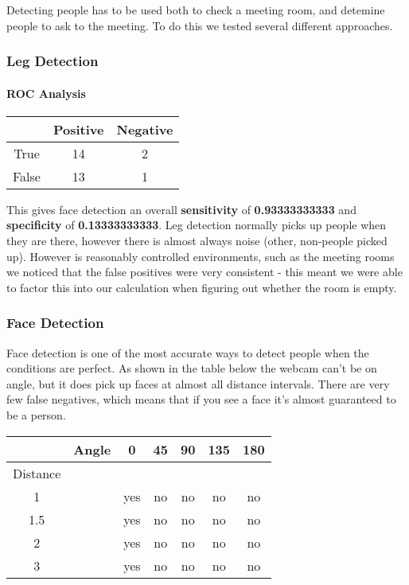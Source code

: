 \documentclass[12pt]{article}
\begin{document}
Detecting people has to be used both to check a meeting room, and detemine people to ask to the meeting. To do this we tested several different approaches.

\subsubsection{Leg Detection}

\paragraph{ROC Analysis}

\begin{center}
\begin{tabular}{|c|c|c|}
\hline
& Positive & Negative\\
\hline
True & 14 & 2 \\
False & 13 & 1 \\

\hline
\end{tabular}
\end{center}

This gives face detection an overall \textbf{sensitivity} of \textbf{0.93333333333} and \textbf{specificity} of \textbf{0.13333333333}. Leg detection normally picks up people when they are there, however there is almost always noise (other, non-people picked up). However is reasonably controlled environments, such as the meeting rooms we noticed that the false positives were very consistent - this meant we were able to factor this into our calculation when figuring out whether the room is empty. 

\subsubsection{Face Detection}
Face detection is one of the most accurate ways to detect people when the conditions are perfect. As shown in the table below the webcam can't be on angle, but it does pick up faces at almost all distance intervals. There are very few false negatives, which means that if you see a face it's almost guaranteed to be a person.

\begin{center}
\begin{tabular}{|c|c|c|c|c|c|c|}
\hline
 & Angle & 0 & 45 & 90 & 135 & 180 \\
\hline
Distance & & & & & & \\
1 & & yes & no & no & no & no \\
1.5 & & yes & no & no & no & no \\
2 & & yes & no & no & no & no \\
3 & & yes & no & no & no & no \\
\hline
\end{tabular}
\end{center}
\end{document}
